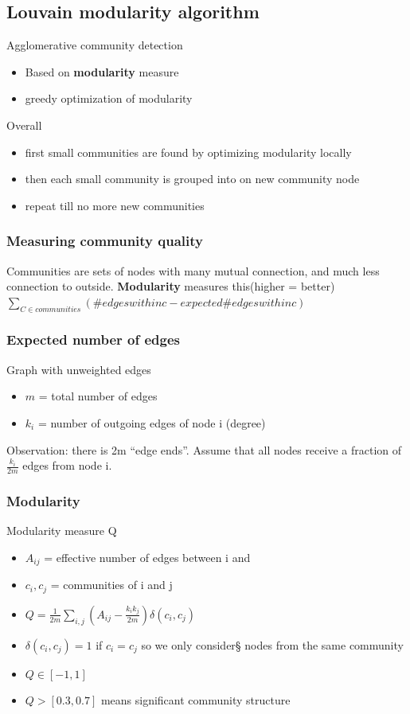 \subsection{Louvain modularity algorithm}

Agglomerative community detection
\begin{itemize}
\item Based on \textbf{modularity} measure
\item greedy optimization of modularity
\end{itemize}

Overall
\begin{itemize}
\item first small communities are found by optimizing modularity
  locally
\item then each small community is grouped into on new community node
\item repeat till no more new communities
\end{itemize}

\subsubsection{Measuring community quality}
Communities are sets of nodes with many mutual connection, and much
less connection to outside. \textbf{Modularity} measures this(higher =
better) \\
$ \sum_{C \in communities} (\#edges within c - expected \# edges
within c )$

\subsubsection{Expected number of edges}
Graph with unweighted edges
\begin{itemize}
\item $ m $ = total number of edges
\item $ k_i $ = number of outgoing edges of node i (degree)
\end{itemize}
Observation: there is 2m ``edge ends''. Assume that all nodes receive
a fraction of $ \frac{k_i}{2m} $ edges from node i.

\subsubsection{Modularity}
Modularity measure Q
\begin{itemize}
\item $ A_{ij} $ = effective number of edges between i and
\item $ c_i, c_j $ = communities of i and j
\item $ Q = \frac{1}{2m} \sum_{i, j} (A_{ij} - \frac{k_i
    k_j}{2m})\delta(c_i, c_j) $
\item $ \delta(c_i, c_j) = 1 $ if $ c_i = c_j $ so we only consider§
  nodes from the same community
\item $ Q \in [-1, 1] $
\item $ Q > [0.3, 0.7] $ means significant community structure
\end{itemize}

